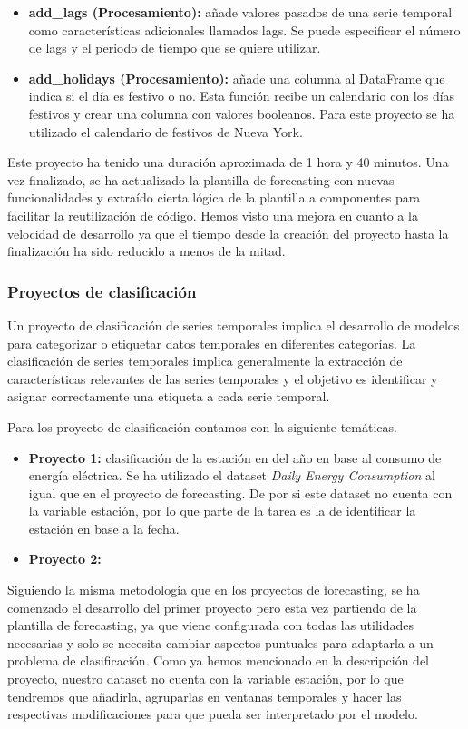 \begin{itemize}
    \item \textbf{add\_lags (Procesamiento):} añade valores pasados de una serie temporal
    como características adicionales llamados lags. Se puede especificar el número de lags
    y el periodo de tiempo que se quiere utilizar.
    \item \textbf{add\_holidays (Procesamiento):} añade una columna al DataFrame que indica
    si el día es festivo o no. Esta función recibe un calendario con los días festivos
    y crear una columna con valores booleanos. Para este proyecto se ha utilizado el calendario
    de festivos de Nueva York.
\end{itemize}

Este proyecto ha tenido una duración aproximada de 1 hora y 40 minutos. Una vez finalizado,
se ha actualizado la plantilla de forecasting con nuevas funcionalidades y extraído cierta
lógica de la plantilla a componentes para facilitar la reutilización de código. Hemos visto
una mejora en cuanto a la velocidad de desarrollo ya que el tiempo desde la creación del proyecto
hasta la finalización ha sido reducido a menos de la mitad.

\subsubsection{Proyectos de clasificación}
Un proyecto de clasificación de series temporales implica el desarrollo de modelos para 
categorizar o etiquetar datos temporales en diferentes categorías. La clasificación de 
series temporales implica generalmente la extracción de características relevantes 
de las series temporales y el objetivo es identificar y asignar correctamente una 
etiqueta a cada serie temporal.\medskip


Para los proyecto de clasificación contamos con la siguiente temáticas.
\begin{itemize}
    \item \textbf{Proyecto 1:} clasificación de la estación en del año en base al consumo de energía eléctrica.
    Se ha utilizado el dataset \textit{Daily Energy Consumption} \cite{Daily_Energy} al igual
    que en el proyecto de forecasting. De por si este dataset no cuenta con la variable estación,
    por lo que parte de la tarea es la de identificar la estación en base a la fecha.
    \item \textbf{Proyecto 2:} 
\end{itemize}

Siguiendo la misma metodología que en los proyectos de forecasting, se ha comenzado
el desarrollo del primer proyecto pero esta vez partiendo de la plantilla de forecasting,
ya que viene configurada con todas las utilidades necesarias y solo se necesita cambiar
aspectos puntuales para adaptarla a un problema de clasificación. Como ya hemos mencionado
en la descripción del proyecto, nuestro dataset no cuenta con la variable estación, por lo
que tendremos que añadirla, agruparlas en ventanas temporales y hacer las respectivas modificaciones
para que pueda ser interpretado por el modelo.\medskip

